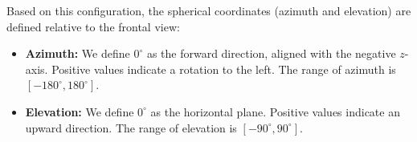 \documentclass{article}
\theoremstyle{plain}
\theoremstyle{definition}
\theoremstyle{remark}
\begin{document}
Based on this configuration, the spherical coordinates (azimuth and elevation) are defined relative to the frontal view:

\begin{itemize}
    \item \textbf{Azimuth:} We define $0^\circ$ as the forward direction, aligned with the negative $z$-axis. Positive values indicate a rotation to the left. The range of azimuth is $[-180^\circ, 180^\circ]$.
    \item \textbf{Elevation:} We define $0^\circ$ as the horizontal plane. Positive values indicate an upward direction. The range of elevation is $[-90^\circ, 90^\circ]$.
\end{itemize}

\end{document}
